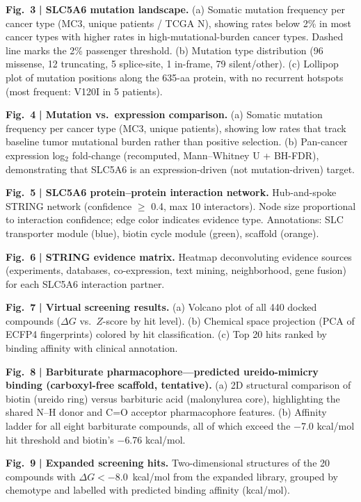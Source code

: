 \documentclass[pdflatex,sn-nature]{sn-jnl}
\begin{document}
\noindent\textbf{Fig.~3} \textbf{| SLC5A6 mutation landscape.} (a) Somatic mutation frequency per cancer type (MC3, unique patients / TCGA N), showing rates below 2\% in most cancer types with higher rates in high-mutational-burden cancer types. Dashed line marks the 2\% passenger threshold. (b) Mutation type distribution (96 missense, 12 truncating, 5 splice-site, 1 in-frame, 79 silent/other). (c) Lollipop plot of mutation positions along the 635-aa protein, with no recurrent hotspots (most frequent: V120I in 5 patients).

\noindent\textbf{Fig.~4} \textbf{| Mutation vs.\ expression comparison.} (a) Somatic mutation frequency per cancer type (MC3, unique patients), showing low rates that track baseline tumor mutational burden rather than positive selection. (b) Pan-cancer expression log$_2$ fold-change (recomputed, Mann--Whitney U + BH-FDR), demonstrating that SLC5A6 is an expression-driven (not mutation-driven) target.

\noindent\textbf{Fig.~5} \textbf{| SLC5A6 protein--protein interaction network.} Hub-and-spoke STRING network (confidence $\ge$ 0.4, max 10 interactors). Node size proportional to interaction confidence; edge color indicates evidence type. Annotations: SLC transporter module (blue), biotin cycle module (green), scaffold (orange).

\noindent\textbf{Fig.~6} \textbf{| STRING evidence matrix.} Heatmap deconvoluting evidence sources (experiments, databases, co-expression, text mining, neighborhood, gene fusion) for each SLC5A6 interaction partner.

\noindent\textbf{Fig.~7} \textbf{| Virtual screening results.} (a) Volcano plot of all 440 docked compounds ($\Delta G$ vs.\ $Z$-score by hit level). (b) Chemical space projection (PCA of ECFP4 fingerprints) colored by hit classification. (c) Top 20 hits ranked by binding affinity with clinical annotation.

\noindent\textbf{Fig.~8} \textbf{| Barbiturate pharmacophore---predicted ureido-mimicry binding (carboxyl-free scaffold, tentative).} (a) 2D structural comparison of biotin (ureido ring) versus barbituric acid (malonylurea core), highlighting the shared N--H donor and C=O acceptor pharmacophore features. (b) Affinity ladder for all eight barbiturate compounds, all of which exceed the $-$7.0 kcal/mol hit threshold and biotin's $-$6.76 kcal/mol.

\noindent\textbf{Fig.~9} \textbf{| Expanded screening hits.} Two-dimensional structures of the 20 compounds with $\Delta G < -8.0$~kcal/mol from the expanded library, grouped by chemotype and labelled with predicted binding affinity (kcal/mol).
\end{document}
